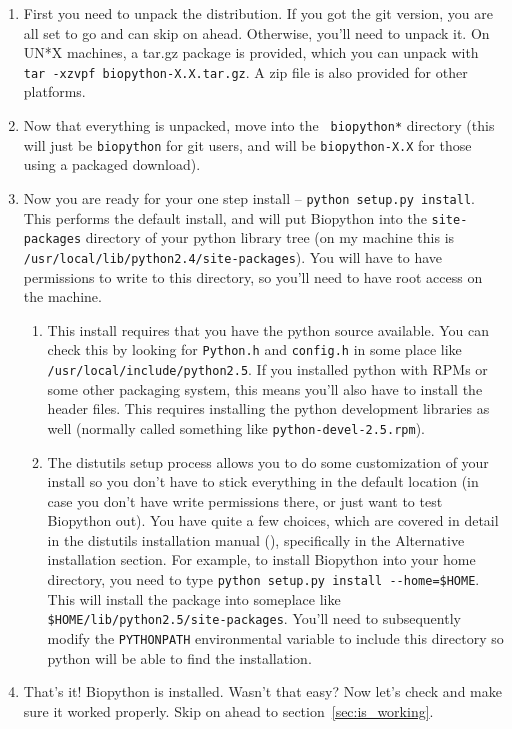\documentclass{article}
\begin{document}
\begin{enumerate}

\item First you need to unpack the distribution. If you got the git version, you are all set to go and can skip on ahead. Otherwise, you'll need to unpack it. On UN*X machines, a tar.gz package is provided, which you can unpack with \verb|tar -xzvpf biopython-X.X.tar.gz|. A zip file is also provided for other platforms.

\item Now that everything is unpacked, move into the \verb| biopython*| directory (this will just be \verb|biopython| for git users, and will be \verb|biopython-X.X| for those using a packaged download). 

\item Now you are ready for your one step install -- \verb|python setup.py install|. This performs the default install, and will put Biopython into the \verb|site-packages| directory of your python library tree (on my machine this is \verb|/usr/local/lib/python2.4/site-packages|). You will have to have permissions to write to this directory, so you'll need to have root access on the machine.

\begin{enumerate}

\item This install requires that you have the python source available. You can check this by looking for \verb|Python.h| and \verb|config.h| in some place like \verb|/usr/local/include/python2.5|. If you installed python with RPMs or 
some other packaging system, this means you'll also have to install the
header files. This requires installing the python development libraries
as well (normally called something like \verb|python-devel-2.5.rpm|).

\item The distutils setup process allows you to do some customization of your install so you don't have to stick everything in the default location (in case you don't have write permissions there, or just want to test Biopython out). You have quite a few choices, which are covered in detail in the distutils installation manual (), specifically in the Alternative installation section. For example, to install Biopython into your home directory, you need to type \verb|python setup.py install --home=$HOME|. This will install the package into someplace like \verb|$HOME/lib/python2.5/site-packages|. You'll need to subsequently modify the \verb|PYTHONPATH| environmental variable to include this directory so python will be able to find the installation.

\end{enumerate}

\item That's it! Biopython is installed. Wasn't that easy? Now let's check and make sure it worked properly. Skip on ahead to section~\ref{sec:is_working}.

\end{enumerate}
\end{document}

